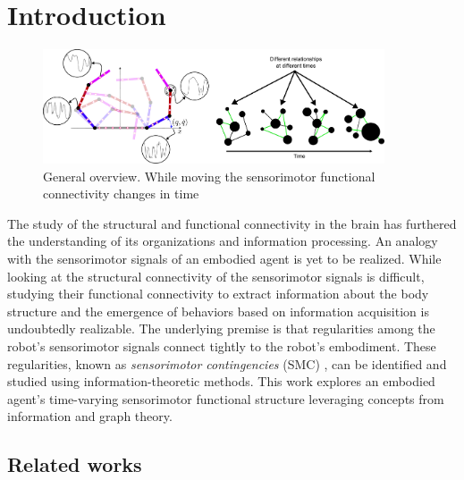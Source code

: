 \section{Introduction}\label{sec:intro}
\begin{figure}[!ht]
	\centering
	\includegraphics[width=0.9\textwidth]{dfc_concept_art.pdf}
	\caption{General overview. While moving the sensorimotor functional connectivity changes in time}
	\label{fig:general_overview}
\end{figure}
The study of the structural and functional connectivity in the brain has furthered the understanding of its organizations and information processing. An analogy with the sensorimotor signals of an embodied agent is yet to be realized. While looking at the structural connectivity of the sensorimotor signals is difficult, studying their functional connectivity to extract information about the body structure and the emergence of behaviors based on information acquisition is undoubtedly realizable. The underlying premise is that regularities among the robot's sensorimotor signals connect tightly to the robot's embodiment. These regularities, known as \emph{sensorimotor contingencies} (SMC) \cite{Jacquey2019Sensorimotorcontingenciesas}, can be identified and studied using information-theoretic methods. This work explores an embodied agent's time-varying sensorimotor functional structure leveraging concepts from information and graph theory. 

\subsection{Related works}

